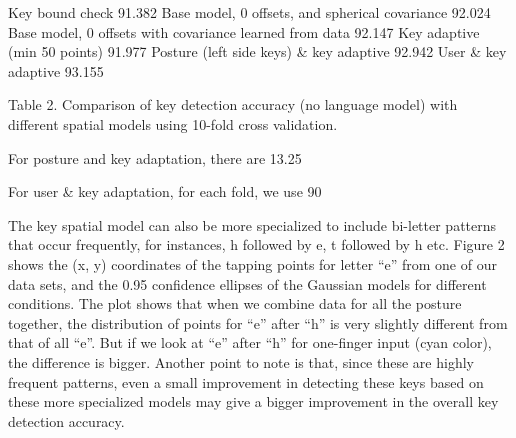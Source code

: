 \documentclass{sigchi}
\begin{document}
Key bound check 91.382%
Base model, 0 offsets, and spherical covariance 92.024%
Base model, 0 offsets with covariance learned from data 92.147%
Key adaptive (min 50 points)  91.977%
Posture (left side keys) & key adaptive 92.942%
User & key adaptive   93.155%

Table 2. Comparison of key detection accuracy (no language model) with different spatial models using 10-fold cross validation.

For posture and key adaptation, there are 13.25%

For user & key adaptation, for each fold, we use 90%

The key spatial model can also be more specialized to include bi-letter patterns that occur frequently, for instances, h followed by e, t followed by h etc. Figure 2 shows the (x, y) coordinates of the tapping points for letter “e” from one of our data sets, and the 0.95 confidence ellipses of the Gaussian models for different conditions. The plot shows that when we combine data for all the posture together, the distribution of points for “e” after “h” is very slightly different from that of all “e”. But if we look at “e” after “h” for one-finger input (cyan color), the difference is bigger. Another point to note is that, since these are highly frequent patterns, even a small improvement in detecting these keys based on these more specialized models may give a bigger improvement in the overall key detection accuracy. 
\end{document}
